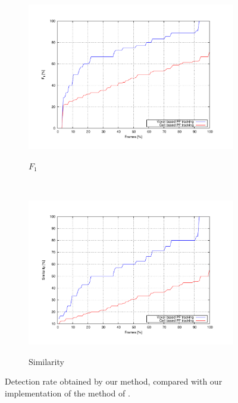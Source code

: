 \begin{figure}[h!]
        \begin{subfigure}[b]{0.5\textwidth}
                \centering
                \includegraphics[width=\textwidth, trim=50 40 80 60,clip]{f1}\label{fig:cp05_f1}
                \caption{$F_1$}
                \label{fig:f1Chart}
        \end{subfigure}%
        ~ %
        \begin{subfigure}[b]{0.5\textwidth}
                \centering
                \includegraphics[width=\textwidth, trim=50 40 80 60,clip]{similarity}\label{fig:cp05_similarity}
                \caption{Similarity}
                \label{fig:similarityChart}
        \end{subfigure}
        \caption{Detection rate obtained by our method, compared with our implementation of the method of \cite{danescu2012particle}.}\label{fig:cp05_detection_rate}
\end{figure}

